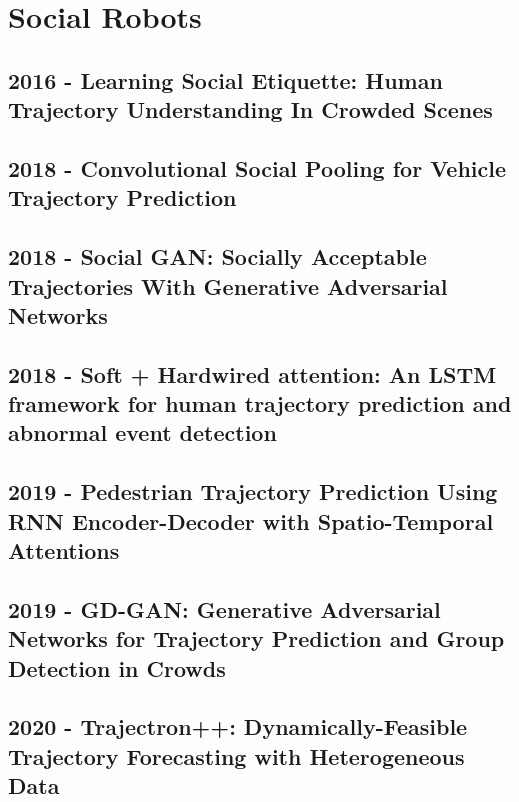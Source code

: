 \section{Social Robots}\label{sec: social robots}

\subsection*{2016 - Learning Social Etiquette: Human Trajectory Understanding In Crowded Scenes}

\cite{robicquet2016learning}

\subsection*{2018 - Convolutional Social Pooling for Vehicle Trajectory Prediction}

\cite{deo2018convolutional}

\subsection*{2018 - Social GAN: Socially Acceptable Trajectories With Generative Adversarial Networks}

\cite{gupta2018social}

\subsection*{2018 - Soft + Hardwired attention: An LSTM framework for human trajectory prediction and abnormal event detection}

\cite{fernando2018soft+}

\subsection*{2019 - Pedestrian Trajectory Prediction Using RNN Encoder-Decoder with Spatio-Temporal Attentions}

\cite{bhujel2019pedestrian}

\subsection*{2019 - GD-GAN: Generative Adversarial Networks for Trajectory Prediction and Group Detection in Crowds}

\cite{fernando2019gd}

\subsection*{2020 - Trajectron++: Dynamically-Feasible Trajectory Forecasting with Heterogeneous Data}

